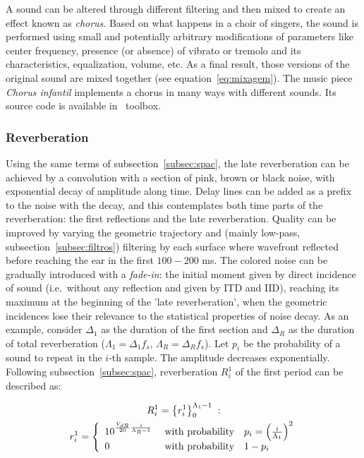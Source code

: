A sound can be altered through different filtering and then mixed to create an effect known as \emph{chorus}. Based on what happens in a choir of singers, the sound is performed using small and potentially arbitrary modifications of parameters like center frequency, presence (or absence) of vibrato or tremolo and its characteristics, equalization, volume, etc. As a final result, those versions of the original sound are mixed together (see equation~\ref{eq:mixagem}). The music piece \emph{Chorus infantil} implements a chorus in many ways with different sounds. Its source code is available in \massa\ toolbox.

\subsubsection{Reverberation}\label{subsubsec:reverb}

Using the same terms of subsection~\ref{subsec:spac}, the
late reverberation can be achieved by a convolution with a section of pink, brown or black noise, with exponential decay of amplitude along time. Delay lines can be added as a prefix to the noise
with the decay, and this contemplates both time parts of the reverberation: the first reflections and the late reverberation. Quality can be improved by varying the geometric trajectory and (mainly low-pass, subsection~\ref{subsec:filtros}) filtering by each surface where wavefront reflected before reaching the ear in the first $100-200$ ms. The colored noise can be gradually introduced with a \emph{fade-in}: the initial moment given by direct
incidence of sound (i.e.\ without any reflection and given by ITD and IID), reaching its maximum at the beginning of the 'late
reverberation', when the geometric incidences lose their relevance to the statistical properties of noise decay. As an example, consider $\Delta_1$ as the duration of the first section and $\Delta_R$ as the duration of total reverberation ($\Lambda_1=\Delta_1 f_s$, $\Lambda_R=\Delta_R
f_s$). Let $p_i$ be the probability of a sound to repeat in the
$i$-th sample. The amplitude decreases exponentially. Following
subsection~\ref{subsec:spac}, reverberation $R_i^1$ of the first period can be described as:

\begin{equation}\label{eq:p1rev}
\begin{split}
    R_i^1=\left\{r_i^1\right\}_0^{\Lambda_1-1}\;:\quad\quad\quad\quad\quad\quad\quad\quad \\ 
\;r_i^1=\left\{
        \begin{array}{l l}
            10^{\frac{V_{dB}}{20}\frac{i}{\Lambda_R-1}}\;  & \text{with probability}\quad p_i=\left(\frac{i}{\Lambda_1}\right)^2 \\
                                     0 \; & \text{with probability}\quad 1-p_i \\
        \end{array} \right.
\end{split}
\end{equation}

